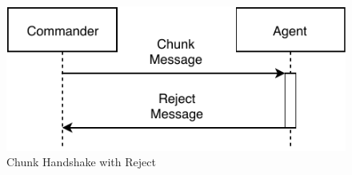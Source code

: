 \begin{figure}[h]
	\begin{center}
	\includegraphics[scale=1]{Resources/PDF/ChunkHandshake2}
	\caption{Chunk Handshake with Reject}
	\label{pic:ChunkHandshake2}
	\end{center}
\end{figure}